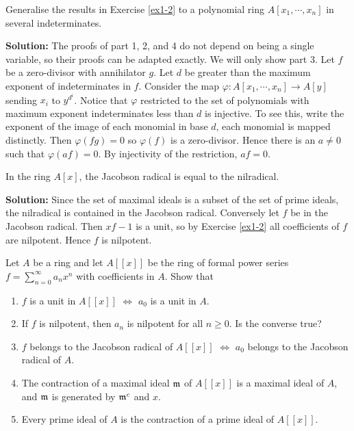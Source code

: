 \documentclass{article}
\begin{document}
\begin{exercise} \label{ex1-3}
    Generalise the results in Exercise \ref{ex1-2} to a polynomial ring \(A[x_1, \cdots, x_n]\) in several indeterminates.
\end{exercise}

\noindent\textbf{Solution:}
The proofs of part 1, 2, and 4 do not depend on being a single variable, so their proofs can be adapted exactly.
We will only show part 3.
Let \(f\) be a zero-divisor with annihilator \(g\).
Let \(d\) be greater than the maximum exponent of indeterminates in \(f\).
Consider the map \(\varphi : A[x_1, \cdots, x_n] \to A[y]\) sending \(x_i\) to \(y^{d^i}\).
Notice that \(\varphi\) restricted to the set of polynomials with maximum exponent indeterminates less than \(d\) is injective.
To see this, write the exponent of the image of each monomial in base \(d\), each monomial is mapped distinctly.
Then \(\varphi(fg) = 0\) so \(\varphi(f)\) is a zero-divisor.
Hence there is an \(a \neq 0\) such that \(\varphi(af) = 0\).
By injectivity of the restriction, \(af = 0\).

\begin{exercise}
    In the ring \(A[x]\), the Jacobson radical is equal to the nilradical.
\end{exercise}

\noindent\textbf{Solution:}
Since the set of maximal ideals is a subset of the set of prime ideals, the nilradical is contained in the Jacobson radical.
Conversely let \(f\) be in the Jacobson radical.
Then \(xf - 1\) is a unit, so by Exercise \ref{ex1-2} all coefficients of \(f\) are nilpotent.
Hence \(f\) is nilpotent.


\begin{exercise}
    Let \(A\) be a ring and let \(A[[x]]\) be the ring of formal power series \(f = \sum_{n=0}^\infty a_n x^n\) with coefficients in \(A\).
    Show that
    \begin{enumerate}
        \item \label{ex1-5-1}
            \(f\) is a unit in \(A[[x]]\) \(\iff\) \(a_0\) is a unit in \(A\).
        \item
            If \(f\) is nilpotent, then \(a_n\) is nilpotent for all \(n \geq 0\).
            Is the converse true?
        \item
            \(f\) belongs to the Jacobson radical of \(A[[x]]\) \(\iff\) \(a_0\) belongs to the Jacobson radical of \(A\).
        \item
            The contraction of a maximal ideal \(\mathfrak{m}\) of \(A[[x]]\) is a maximal ideal of \(A\), and \(\mathfrak{m}\) is generated by \(\mathfrak{m}^c\) and \(x\).
        \item
            Every prime ideal of \(A\) is the contraction of a prime ideal of \(A[[x]]\).
    \end{enumerate}
\end{exercise}
\end{document}
